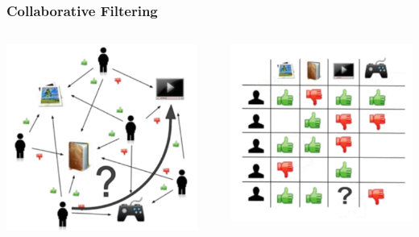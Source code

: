 \documentclass[11pt,aspectratio=169]{beamer}
\makeatletter
\def\tikzscale{1}\begin{lrbox}{\measure@tikzpicture}%
\edef\tikzscale{\pgfmathresult}%
\makeatother
\begin{document}
	\begin{frame}
		\frametitle{Collaborative Filtering}
		\begin{columns}
			\begin{column}{0.3\textwidth}
				\includegraphics[width=\textwidth]{images/cf-stage1.png}
			\end{column}\pause
			\begin{column}{0.05\textwidth}
				\begin{scaletikzpicturetowidth}{\textwidth}
				\end{scaletikzpicturetowidth}
			\end{column}
			\begin{column}{0.3\textwidth}
				\includegraphics[width=\textwidth]{images/cf-stage2.png}

\end{column}
\end{columns}
\end{frame}
\end{document}
